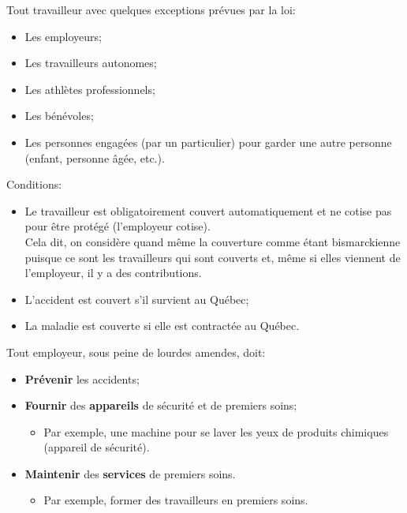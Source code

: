 \documentclass[10pt, french]{article}
\begin{document}
\begin{multicols*}{3}


\begin{definitionNOHFILLsub}[Couverture]
Tout travailleur avec quelques exceptions prévues par la loi:
\begin{itemize}[leftmargin = *]
	\item	Les employeurs;
	\item	Les travailleurs autonomes;
	\item	Les athlètes professionnels;
	\item	Les bénévoles;
	\item	Les personnes engagées (par un particulier) pour garder une autre personne (enfant, personne âgée, etc.).
\end{itemize}

Conditions:
\begin{itemize}[leftmargin = *]
	\item	Le travailleur est obligatoirement couvert automatiquement et ne cotise pas pour être protégé (l'employeur cotise).\\
			Cela dit, on considère quand même la couverture comme étant bismarckienne puisque ce sont les travailleurs qui sont couverts et, même si elles viennent de l'employeur, il y a des contributions.
	\item	L'accident est couvert s'il survient au Québec;
	\item	La maladie est couverte si elle est contractée au Québec.
\end{itemize}
\end{definitionNOHFILLsub}

\begin{definitionNOHFILLsub}[Prévention]
Tout employeur, sous peine de lourdes amendes, doit:
\begin{itemize}[leftmargin = *]
	\item	\textbf{Prévenir} les accidents;
	\item	\textbf{Fournir} des \textbf{appareils} de sécurité et de premiers soins;
		\begin{itemize}[leftmargin = *]
		\item	Par exemple, une machine pour se laver les yeux de produits chimiques (appareil de sécurité).
		\end{itemize}
	\item	\textbf{Maintenir} des \textbf{services} de premiers soins.
		\begin{itemize}[leftmargin = *]
		\item	Par exemple, former des travailleurs en premiers soins.
		\end{itemize}
\end{itemize}


\end{definitionNOHFILLsub}
\end{multicols*}
\end{document}
